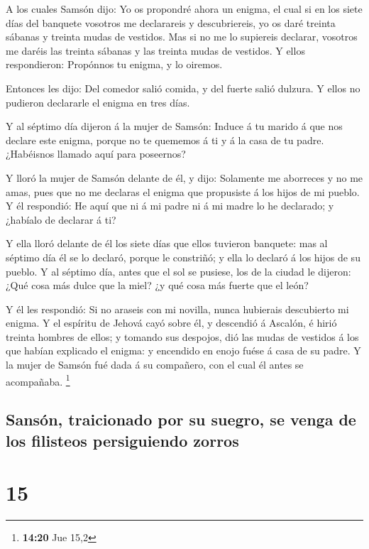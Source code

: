  A los cuales Samsón dijo: Yo os propondré ahora un enigma,
el cual si en los siete días del banquete vosotros me declarareis y
descubriereis, yo os daré treinta sábanas y treinta mudas de vestidos.
 Mas si no me lo supiereis declarar, vosotros me daréis las
treinta sábanas y las treinta mudas de vestidos. Y ellos respondieron:
Propónnos tu enigma, y lo oiremos.

 Entonces les dijo: Del comedor salió comida, y del fuerte
salió dulzura. Y ellos no pudieron declararle el enigma en tres días.

 Y al séptimo día dijeron á la mujer de Samsón: Induce á tu
marido á que nos declare este enigma, porque no te quememos á ti y á la
casa de tu padre. ¿Habéisnos llamado aquí para poseernos?

 Y lloró la mujer de Samsón delante de él, y dijo:
Solamente me aborreces y no me amas, pues que no me declaras el enigma
que propusiste á los hijos de mi pueblo. Y él respondió: He aquí que ni
á mi padre ni á mi madre lo he declarado; y ¿habíalo de declarar á ti?

 Y ella lloró delante de él los siete días que ellos
tuvieron banquete: mas al séptimo día él se lo declaró, porque le
constriñó; y ella lo declaró á los hijos de su pueblo.  Y
al séptimo día, antes que el sol se pusiese, los de la ciudad le
dijeron: ¿Qué cosa más dulce que la miel? ¿y qué cosa más fuerte que el
león?

 Y él les respondió: Si no araseis con mi novilla, nunca
hubierais descubierto mi enigma.  Y el espíritu de Jehová
cayó sobre él, y descendió á Ascalón, é hirió treinta hombres de ellos;
y tomando sus despojos, dió las mudas de vestidos á los que habían
explicado el enigma: y encendido en enojo fuése á casa de su padre. Y la
mujer de Samsón fué dada á su compañero, con el cual él antes se
acompañaba. \footnote{\textbf{14:20} Jue 15,2}

\hypertarget{sansuxf3n-traicionado-por-su-suegro-se-venga-de-los-filisteos-persiguiendo-zorros}{%
\subsection{Sansón, traicionado por su suegro, se venga de los filisteos
persiguiendo
zorros}\label{sansuxf3n-traicionado-por-su-suegro-se-venga-de-los-filisteos-persiguiendo-zorros}}

\hypertarget{section-14}{%
\section{15}\label{section-14}}

